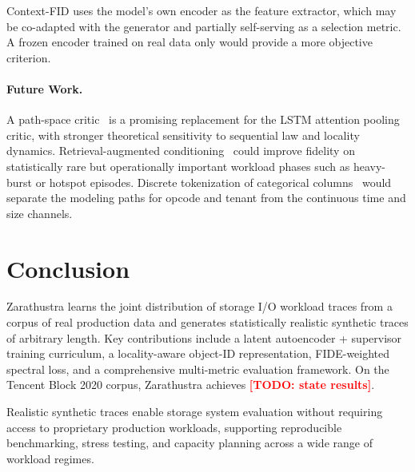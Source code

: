 \documentclass[10pt,twocolumn]{article}
\newcommand{\sys}{Zarathustra\xspace}
\newcommand{\todo}[1]{\textcolor{red}{\textbf{[TODO: #1]}}}
\begin{document}
Context-FID uses the model's own encoder as the feature extractor,
which may be co-adapted with the generator and partially self-serving
as a selection metric.  A frozen encoder trained on real data only
would provide a more objective criterion.

\paragraph{Future Work.}
A path-space critic~\cite{pcfgan2023,hrpcf2024} is a promising
replacement for the LSTM attention pooling critic, with stronger
theoretical sensitivity to sequential law and locality dynamics.
Retrieval-augmented conditioning~\cite{retrieval_diffusion2024} could
improve fidelity on statistically rare but operationally important
workload phases such as heavy-burst or hotspot episodes.
Discrete tokenization of categorical columns~\cite{sdformer2024}
would separate the modeling paths for opcode and tenant from the
continuous time and size channels.


\section{Conclusion}
\label{sec:conclusion}

\sys learns the joint distribution of storage I/O workload traces
from a corpus of real production data and generates statistically
realistic synthetic traces of arbitrary length.  Key contributions
include a latent autoencoder + supervisor training curriculum, a
locality-aware object-ID representation, FIDE-weighted spectral loss,
and a comprehensive multi-metric evaluation framework.  On the
Tencent Block 2020 corpus, \sys achieves \todo{state results}.

Realistic synthetic traces enable storage system evaluation without
requiring access to proprietary production workloads, supporting
reproducible benchmarking, stress testing, and capacity planning
across a wide range of workload regimes.




\end{document}
